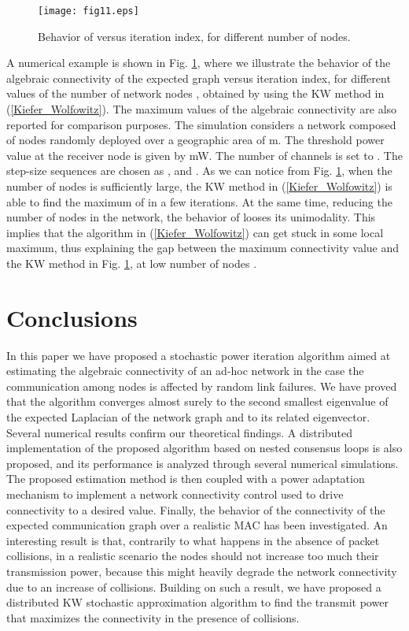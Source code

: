 \documentclass[10pt,twocolumn]{IEEEtran}
\begin{document}
\begin{figure}[t]
\centering
\texttt{[image: fig11.eps]}
  \caption{Behavior of  versus iteration index, for different number  of nodes.}\label{Max_conv}
\end{figure}
A numerical example is shown in Fig. \ref{Max_conv}, where we illustrate the behavior of the algebraic connectivity of the expected graph  versus iteration index, for different values of the number of network nodes , obtained by using the KW method in (\ref{Kiefer_Wolfowitz}). The maximum values of the algebraic connectivity are also reported for comparison purposes. The simulation considers a network composed of  nodes randomly deployed over a geographic area of  m. The threshold power value at the receiver node is given by  mW. The number of channels is set to . The step-size sequences are chosen as , and . As we can notice from Fig. \ref{Max_conv}, when the number of nodes is sufficiently large, the KW method in (\ref{Kiefer_Wolfowitz}) is able to find the maximum of  in a few iterations. At the same time, reducing the number of nodes in the network, the behavior of  looses its unimodality. This implies that the algorithm in (\ref{Kiefer_Wolfowitz}) can get stuck in some local maximum, thus explaining the gap between the maximum connectivity value and the KW method in Fig. \ref{Max_conv}, at low number of nodes .


\section{Conclusions}

In this paper we have proposed a stochastic power iteration algorithm aimed at estimating the algebraic connectivity of an ad-hoc network in the case the communication among nodes is affected by random link failures.  We have proved that the algorithm converges almost surely to the second smallest eigenvalue of the expected Laplacian of the network graph and to its related eigenvector. Several numerical results confirm our theoretical findings. A distributed implementation of the proposed algorithm based on nested consensus loops is also proposed, and its performance is analyzed through several numerical simulations.
The proposed estimation method is then coupled with a power adaptation mechanism to implement a network connectivity
 control used to drive connectivity to a desired value. Finally, the behavior of the connectivity of the expected communication graph over a realistic MAC has been investigated. An interesting result is that, contrarily to what happens in the  absence of packet collisions, in a realistic scenario the nodes should not increase too much their transmission power, because this might heavily degrade the network connectivity due to an increase of collisions. Building on such a result, we have proposed a distributed KW stochastic approximation algorithm to find the transmit power that maximizes the connectivity in the presence of collisions.
\end{document}
